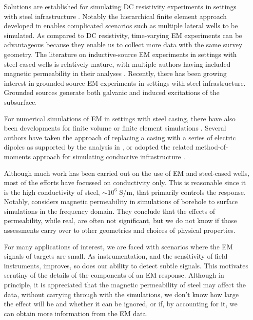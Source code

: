 \documentclass[onecolumn, extra, mreferee]{gji}
\begin{document}
Solutions are established for simulating DC resistivity experiments in settings with steel infrastructure \cite{schenkel_electrical_1994, yang_3d_2016, heagy_direct_2019}. Notably the hierarchical finite element approach developed in \cite{Weiss2017} enables complicated scenarios such as multiple lateral wells to be simulated. As compared to DC resistivity, time-varying EM experiments can be advantageous because they enable us to collect more data with the same survey geometry. The literature on inductive-source EM experiments in settings with steel-cased wells is relatively mature, with multiple authors having included magnetic permeability in their analyses \citep{augustin_theoretical_1989, Wu1994, kaufman_influence_1996, Wilt1996}. Recently, there has been growing interest in grounded-source EM experiments in settings with steel infrastructure. Grounded sources generate both galvanic and induced excitations of the subsurface.

For numerical simulations of EM in settings with steel casing, there have also been developments for finite volume or finite element simulations \citep{Um2015, commer_transient-electromagnetic_2015, haber_modeling_2016, heagy_modeling_2019}. Several authors have taken the approach of replacing a casing with a series of electric dipoles as supported by the analysis in \citep{cuevas_analytical_2014}, or adopted the related method-of-moments approach for simulating conductive infrastructure \citep{tang_three-dimensional_2015, patzer_steel-cased_2017, kohnke_method_2018, orujov_electromagnetic_2020}.

Although much work has been carried out on the use of EM and steel-cased wells, most of the efforts have focussed on conductivity only. This is reasonable since it is the high conductivity of steel, $\sim 10^6$ S/m, that primarily controls the response. Notably, \cite{cuevas_effect_2018} considers magnetic permeability in simulations of borehole to surface simulations in the frequency domain. They conclude that the effects of permeability, while real, are often not significant, but we do not know if those assessments carry over to other geometries and choices of physical properties.

For many applications of interest, we are faced with scenarios where the EM signals of targets are small. As instrumentation, and the sensitivity of field instruments, improves, so does our ability to detect subtle signals. This motivates scrutiny of the details of the components of an EM response. Although in principle, it is appreciated that the magnetic permeability of steel may affect the data, without carrying through with the simulations, we don't know how large the effect will be and whether it can be ignored, or if, by accounting for it, we can obtain more information from the EM data.
\end{document}
